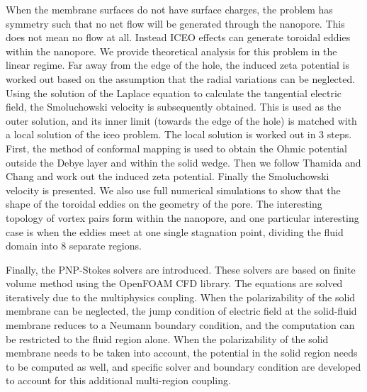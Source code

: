 When the membrane surfaces do not have surface charges, the problem has symmetry such that no net flow will be generated through the nanopore. This does not mean no flow at all. Instead ICEO effects can generate toroidal eddies within the nanopore. We provide theoretical analysis for this problem in the linear regime. Far away from the edge of the hole, the induced zeta potential is worked out based on the assumption that the radial variations can be neglected. Using the solution of the Laplace equation to calculate the tangential electric field, the Smoluchowski velocity is subsequently obtained. This is used as the outer solution, and its inner limit (towards the edge of the hole) is matched with a local solution of the iceo problem. The local solution is worked out in 3 steps. First, the method of conformal mapping is used to obtain the Ohmic potential outside the Debye layer and within the solid wedge. Then we follow Thamida and Chang \cite{Thamida2002} and work out the induced zeta potential. Finally the Smoluchowski velocity is presented. We also use full numerical simulations to show that the shape of the toroidal eddies on the geometry of the pore. The interesting topology of vortex pairs form within the nanopore, and one particular interesting case is when the eddies meet at one single stagnation point, dividing the fluid domain into 8 separate regions.

Finally, the PNP-Stokes solvers are introduced. These solvers are based on finite volume method using the OpenFOAM CFD library. The equations are solved iteratively due to the multiphysics coupling. When the polarizability of the solid membrane can be neglected, the jump condition of electric field at the solid-fluid membrane reduces to a Neumann boundary condition, and the computation can be restricted to the fluid region alone. When the polarizability of the solid membrane needs to be taken into account, the potential in the solid region needs to be computed as well, and specific solver and boundary condition are developed to account for this additional multi-region coupling.